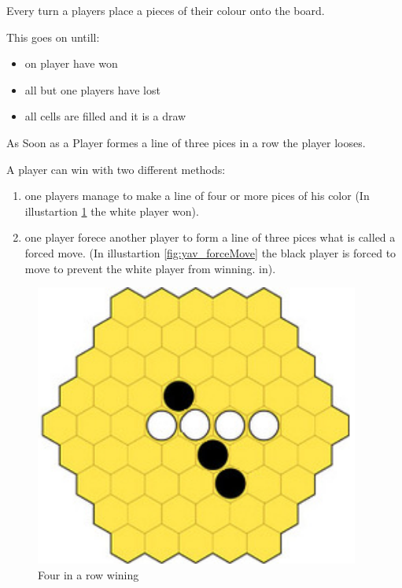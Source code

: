 \documentclass[german]{report}
\begin{document}
Every turn a players place a pieces of their colour onto the board. 

This goes on untill:
\begin{itemize}
	\item on player have won
	\item all but one players have lost
	\item all cells are filled and it is a draw
\end{itemize}

As Soon as a Player formes a line of three pices in a row the player looses.

A player can win with two different methods:
\begin{enumerate}
	\item one players manage to make a line of four or more pices of his color (In illustartion  \ref{fig:yav_4inarow} the white player won).
	\item one player forece another player to form a line of three pices what is called a forced move. (In illustartion  \ref{fig:yav_forceMove} the black player is forced to move to prevent the white player from winning. in).
\end{enumerate}

\begin{figure}[ht]
\centering
\includegraphics[width=0.95\textwidth]{Abbildungen/yav_4inarow.png}
\caption[Four in a row wining, Source:\cite{yvalathHP}]{Four in a row wining}
\label{fig:yav_4inarow}
\end{figure}
\end{document}
